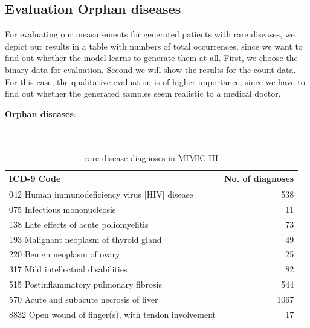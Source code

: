 \documentclass[11pt, a4paper, oneside]{book}
\begin{document}
\subsection{Evaluation Orphan diseases}
For evaluating our measurements for generated patients with rare diseases, we depict our results in a table with numbers of total occurrences, since we want to find out whether the model learns to generate them at all. First, we choose the binary data for evaluation. Second we will show the results for the count data.
For this case, the qualitative evaluation is of higher importance, since we have to find out whether the generated samples seem realistic to a medical doctor.


\textbf{Orphan diseases}:
\\
\\
\\
\begin{table}
\begin{center}
\begin{tabularx}{\textwidth}{X|r}
\textbf{ICD-9 Code} & \textbf{No. of diagnoses}\\
\hline
042 Human immunodeficiency virus [HIV] disease & 538\\
075 Infectious mononucleosis & 11\\
138 Late effects of acute poliomyelitis & 73 \\
193 Malignant neoplasm of thyroid gland & 49 \\
220 Benign neoplasm of ovary & 25\\
317 Mild intellectual disabilities & 82\\
515 Postinflammatory pulmonary fibrosis & 544\\
570 Acute and subacute necrosis of liver & 1067\\
8832 Open wound of finger(s), with tendon involvement & 17\\ 
\end{tabularx}
\end{center}
\caption{\label{tab:rare-MIMIC-III}rare disease diagnoses in MIMIC-III}
\end{table}
\end{document}
